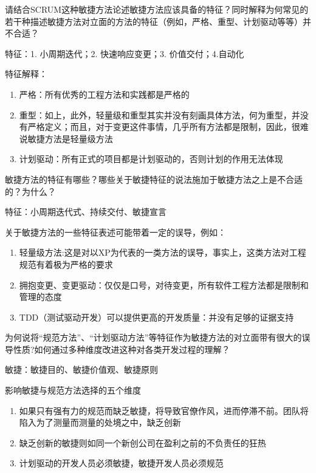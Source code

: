 \begin{problem}[2015B、2016]
请结合SCRUM这种敏捷方法论述敏捷方法应该具备的特征？同时解释为何常见的若干种描述敏捷方法对立面的方法的特征（例如，严格、重型、计划驱动等等）并不合适？
\end{problem}

\begin{solution}
特征：1. 小周期迭代；2. 快速响应变更；3. 价值交付；4.自动化

特征解释：
\begin{enumerate}[label=\arabic*.]
    \item 严格：所有优秀的工程方法和实践都是严格的
    \item 重型：如上，此外，轻量级和重型其实并没有刻画具体方法，何为重型，并没有严格定义；而且，对于变更这件事情，几乎所有方法都是限制，因此，很难说敏捷方法是轻量级方法
    \item 计划驱动：所有正式的项目都是计划驱动的，否则计划的作用无法体现
\end{enumerate}
\end{solution}


\begin{problem}[2015A]
敏捷方法的特征有哪些？哪些关于敏捷特征的说法施加于敏捷方法之上是不合适的？为什么？
\end{problem}

\begin{solution}
特征：小周期迭代式、持续交付、敏捷宣言

关于敏捷方法的一些特征表述可能带着一定的误导，例如：
\begin{enumerate}[label=\arabic*.]
    \item 轻量级方法:这是对以XP为代表的一类方法的误导，事实上，这类方法对工程规范有着极为严格的要求
    \item 拥抱变更、变更驱动：仅仅是口号，对待变更，所有软件工程方法都是限制和管理的态度
    \item TDD（测试驱动开发）可以提供更高的开发质量：并没有足够的证据支持
\end{enumerate}
\end{solution}



\begin{problem}[2014]
为何说将“规范方法”、“计划驱动方法”等特征作为敏捷方法的对立面带有很大的误导性质?如何通过多种维度改进这种对各类开发过程的理解？
\end{problem}

\begin{solution}
敏捷：敏捷目的、敏捷价值观、敏捷原则

影响敏捷与规范方法选择的五个维度
\begin{enumerate}[label=\arabic*.]
    \item 如果只有强有力的规范而缺乏敏捷，将导致官僚作风，进而停滞不前。团队将陷入为了测量而测量的处境之中，缺乏创新
    \item 缺乏创新的敏捷则如同一个新创公司在盈利之前的不负责任的狂热
    \item 计划驱动的开发人员必须敏捷，敏捷开发人员必须规范
\end{enumerate}
\end{solution}




